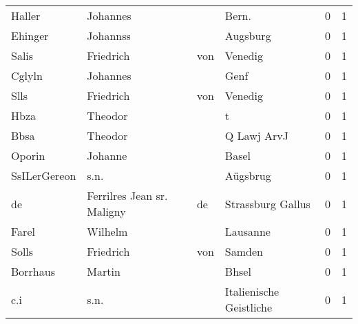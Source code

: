 \begin{tabular}{llllrr}
                   Haller &                           Johannes &             &                                      Bern.  &          0 &         1 \\
                  Ehinger &                           Johannss &             &                                    Augsburg &          0 &         1 \\
                    Salis &                          Friedrich &         von &                                     Venedig &          0 &         1 \\
                   Cglyln &                           Johannes &             &                                        Genf &          0 &         1 \\
                     Slls &                          Friedrich &         von &                                     Venedig &          0 &         1 \\
                     Hbza &                            Theodor &             &                                           t &          0 &         1 \\
                     Bbsa &                            Theodor &             &                                 Q Lawj ArvJ &          0 &         1 \\
                   Oporin &                            Johanne &             &                                       Basel &          0 &         1 \\
             SsILerGereon &                               s.n. &             &                                    Aügsbrug &          0 &         1 \\
                       de &         Ferrilres Jean sr. Maligny &          de &                           Strassburg Gallus &          0 &         1 \\
                    Farel &                            Wilhelm &             &                                    Lausanne &          0 &         1 \\
                    Solls &                          Friedrich &         von &                                      Samden &          0 &         1 \\
                 Borrhaus &                             Martin &             &                                       Bhsel &          0 &         1 \\
                      c.i &                               s.n. &             &                     Italienische Geistliche &          0 &         1 \\

\end{tabular}
